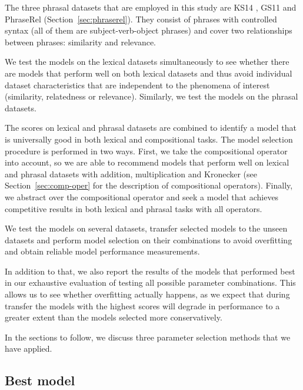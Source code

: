The three phrasal  datasets that are employed in this study are KS14 \cite{kartsadrqpl2014}, GS11 \cite{Grefenstette:2011:ESC:2145432.2145580} and PhraseRel (Section~\ref{sec:phraserel}). They consist of phrases with controlled syntax (all of them are subject-verb-object phrases) and cover two relationships between phrases: similarity and relevance.

We test the models on the lexical datasets simultaneously to see whether there are models that perform well on both lexical datasets and thus avoid individual dataset characteristics that are independent to the phenomena of interest (similarity, relatedness or relevance). Similarly, we test the models on the phrasal datasets.

The scores on lexical and phrasal datasets are combined to identify a model that is universally good in both lexical and compositional tasks. The model selection procedure is performed in two ways. First, we take the compositional operator into account, so we are able to recommend models that perform well on lexical and phrasal datasets with addition, multiplication and Kronecker (see Section~\ref{sec:comp-oper} for the description of compositional operators). Finally, we abstract over the compositional operator and seek a model that achieves competitive results in both lexical and phrasal tasks with all operators.
%

We test the models on several datasets, transfer selected models to the unseen datasets and perform model selection on their combinations to avoid overfitting and obtain reliable model performance measurements.

In addition to that, we also report the results of the models that performed best in our exhaustive evaluation of testing all possible parameter combinations. This allows us to see whether overfitting actually happens, as we expect that during transfer the models with the highest scores will degrade in performance to a greater extent than the models selected more conservatively.

In the sections to follow, we discuss three parameter selection methods that we have applied.

\subsection{Best model}

